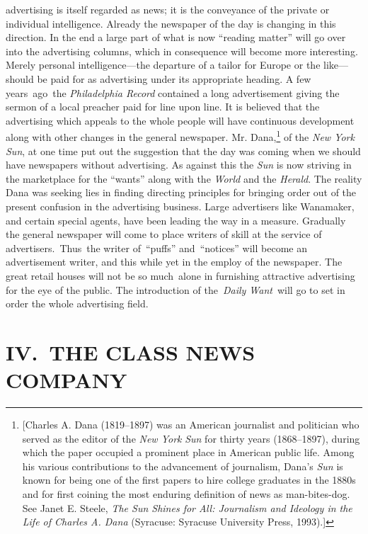 \documentclass[twoside,symmetric,nobib,justified]{tufte-book}
\begin{document}
advertising is itself regarded as news; it is the conveyance of the
private or individual intelligence. Already the newspaper of the day is
changing in this direction. In the end a large part of what is now
``reading matter'' will go over into the advertising columns, which in
consequence will become more interesting. Merely personal
intelligence---the departure of a tailor for Europe or the like---should
be paid for as advertising under its appropriate heading. A few
years~ago~the \emph{Philadelphia Record} contained a long advertisement
giving the sermon of a local preacher paid for line upon line. It is
believed that the advertising which appeals to the whole people will
have continuous development along with other changes in the general
newspaper. Mr. Dana,\footnote{{[}Charles A. Dana (1819--1897) was an
  American journalist and politician who served as the editor of the
  \emph{New York} \emph{Sun} for thirty years (1868--1897), during which
  the paper occupied a prominent place in American public life. Among
  his various contributions to the advancement of journalism, Dana's
  \emph{Sun} is known for being one of the first papers to hire college
  graduates in the 1880s and for first coining the most enduring
  definition of news as man-bites-dog. See Janet E. Steele, \emph{The
  Sun Shines for All: Journalism and Ideology in the Life of Charles A.
  Dana} (Syracuse: Syracuse University Press, 1993).{]}} of the
\emph{New York Sun}, at one time put out the suggestion that the day was
coming when we should have newspapers without advertising. As against
this the \emph{Sun} is now striving in the marketplace for the ``wants''
along with the \emph{World} and the \emph{Herald}. The reality Dana was
seeking lies in finding directing principles for bringing order out of
the present confusion in the advertising business. Large advertisers
like Wanamaker, and certain special agents, have been leading the way in
a measure. Gradually the general newspaper will come to place writers of
skill at the service of advertisers.~Thus~the writer of~``puffs''
and~``notices'' will become an advertisement writer, and this while yet
in the employ of the newspaper. The great retail houses will not be so
much~alone in furnishing attractive advertising for the eye of the
public. The introduction of the~\emph{Daily Want}~will go to set in
order the whole advertising field.~~

\hypertarget{iv-the-class-news-company}{%
\section{IV.~THE CLASS NEWS
COMPANY}\label{iv-the-class-news-company}}
\end{document}
